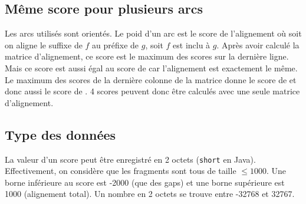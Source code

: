 \subsection{Même score pour plusieurs arcs}
Les arcs utilisés sont orientés. Le poid d'un arc  est le score de l'alignement où soit on aligne le suffixe de $f$ au préfixe de $g$, soit $f$ est inclu à $g$.
Après avoir calculé la matrice d'alignement, ce score est le maximum des scores sur la dernière ligne.
Mais ce score est aussi égal au score de  car l'alignement est exactement le même.
Le maximum des scores de la dernière colonne de la matrice donne le score de  et donc aussi le score de .
4 scores peuvent donc être calculés avec une seule matrice d'alignement.

\subsection{Type des données} %
La valeur d'un score peut être enregistré en 2 octets (\texttt{short} en Java).
Effectivement, on considère que les fragments sont tous de taille $\le 1000$. %
Une borne inférieure au score est -2000 (que des gaps) %
et une borne supérieure est 1000 (alignement total).
Un nombre en 2 octets se trouve entre -32768 et 32767.